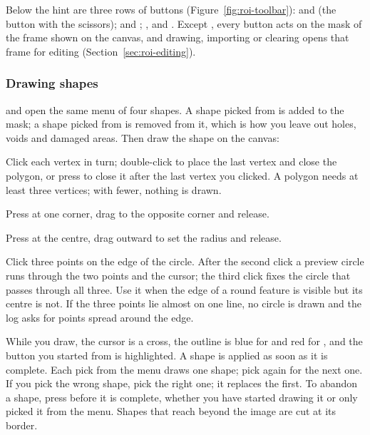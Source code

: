 Below the hint are three rows of buttons (Figure~\ref{fig:roi-toolbar}):  and
 (the button with the scissors);  and ; ,
 and . Except , every button acts on the mask of the frame
shown on the canvas, and drawing, importing or clearing opens that frame for editing
(Section~\ref{sec:roi-editing}).

\subsubsection*{Drawing shapes}

 and  open the same menu of four shapes. A shape picked from  is
added to the mask; a shape picked from  is removed from it, which is how you leave out
holes, voids and damaged areas. Then draw the shape on the canvas:
\begin{description}[leftmargin=1.2cm,style=nextline]
  \item[Polygon]
    Click each vertex in turn; double-click to place the last vertex and close the polygon, or
    press  to close it after the last vertex you clicked.
    A polygon needs at least three vertices; with fewer, nothing is drawn.
  \item[Rectangle]
    Press at one corner, drag to the opposite corner and release.
  \item[Circle]
    Press at the centre, drag outward to set the radius and release.
  \item[Circle (3-point)]
    Click three points on the edge of the circle. After the second click a preview circle runs
    through the two points and the cursor; the third click fixes the circle that passes through
    all three. Use it when the edge of a round feature is visible but its centre is not. If the
    three points lie almost on one line, no circle is drawn and the log asks for points spread
    around the edge.
\end{description}

While you draw, the cursor is a cross, the outline is blue for  and red for ,
and the button you started from is highlighted. A shape is applied as soon as it is complete.
Each pick from the menu draws one shape; pick again for the next one. If you pick the wrong
shape, pick the right one; it replaces the first. To abandon a shape, press  before it
is complete, whether you have started drawing it or only picked it from the menu. Shapes that reach beyond the image are cut at its border.

